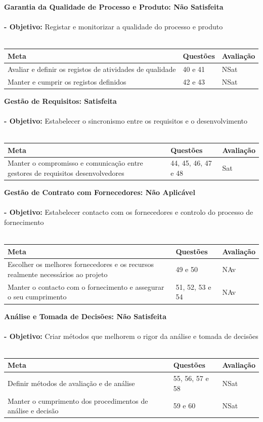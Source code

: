 \documentclass[openany,10pt,a4paper]{article}
\begin{document}
\textbf{Garantia da Qualidade de Processo e Produto: Não Satisfeita} \\  \\
\textbf{- Objetivo:} Registar e monitorizar a qualidade do processo e produto \\
\\
\begin{tabular}{p{3in}|p{1.5in}|p{1.5in}}	
\textbf{Meta} & \textbf{Questões} & \textbf{Avaliação} \\ \hline
Avaliar e definir os registos de atividades de qualidade & 40 e 41 & NSat \\ 
Manter e cumprir os registos definidos & 42 e 43 & NSat \\ 
\end{tabular}

\textbf{Gestão de Requisitos: Satisfeita} \\  \\
\textbf{- Objetivo:} Estabelecer o sincronismo entre os requisitos e o desenvolvimento \\
\\
\begin{tabular}{p{3in}|p{1.5in}|p{1.5in}}		
\textbf{Meta} & \textbf{Questões} & \textbf{Avaliação} \\ \hline
Manter o compromisso e comunicação entre gestores de requisitos desenvolvedores & 44, 45, 46, 47 e 48 & Sat \\ 
\end{tabular}

\textbf{Gestão de Contrato com Fornecedores: Não Aplicável} \\  \\
\textbf{- Objetivo:} Estabelecer contacto com os fornecedores e controlo do processo de fornecimento \\
\\
\begin{tabular}{p{3in}|p{1.5in}|p{1.5in}}	
\textbf{Meta} & \textbf{Questões} & \textbf{Avaliação} \\ \hline
Escolher os melhores fornecedores e os recursos realmente necessários ao projeto & 49 e 50 & NAv \\ 
Manter o contacto com o fornecimento e assegurar o seu cumprimento & 51, 52, 53 e 54 & NAv \\ 
\end{tabular}

\textbf{Análise e Tomada de Decisões: Não Satisfeita} \\  \\
\textbf{- Objetivo:} Criar métodos que melhorem o rigor da análise e tomada de decisões \\
\\
\begin{tabular}{p{3in}|p{1.5in}|p{1.5in}}	
\textbf{Meta} & \textbf{Questões} & \textbf{Avaliação} \\ \hline
Definir métodos de avaliação e de análise & 55, 56, 57 e 58 & NSat \\ 
Manter o cumprimento dos procedimentos de análise e decisão & 59 e 60 & NSat \\
\end{tabular}
\end{document}
